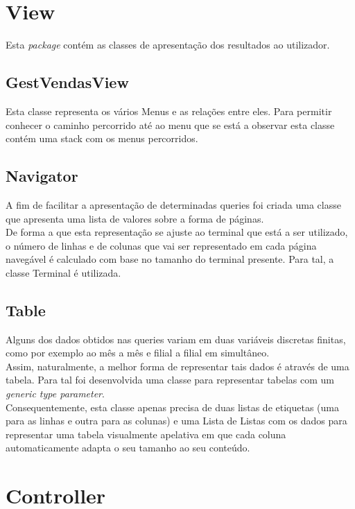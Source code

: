 \documentclass[a4paper]{report}
\begin{document}
\section{View}

Esta \textit{package} contém as classes de apresentação dos resultados ao utilizador.

\subsection{GestVendasView}

Esta classe representa os vários Menus e as relações entre eles. Para permitir
conhecer o caminho percorrido até ao menu que se está a observar esta classe
contém uma stack com os menus percorridos.

\subsection{Navigator}

A fim de facilitar a apresentação de determinadas queries foi criada uma classe que apresenta uma
lista de valores sobre a forma de páginas.\\
De forma a que esta representação se ajuste ao terminal que está a ser utilizado, o número de linhas
e de colunas que vai ser representado em cada página navegável é calculado com base no tamanho do
terminal presente. Para tal, a classe Terminal é utilizada.

\subsection{Table}

Alguns dos dados obtidos nas queries variam em duas variáveis discretas finitas, como por exemplo
ao mês a mês e filial a filial em simultâneo.\\
Assim, naturalmente, a melhor forma de representar tais dados é através de uma tabela.
Para tal foi desenvolvida uma classe para representar tabelas com um \textit{generic type parameter}.\\
Consequentemente, esta classe apenas precisa de duas listas de etiquetas (uma para as linhas e
outra para as colunas) e uma Lista de Listas com os dados para representar uma tabela visualmente
apelativa em que cada coluna automaticamente adapta o seu tamanho ao seu conteúdo.

\section{Controller}
\end{document}
